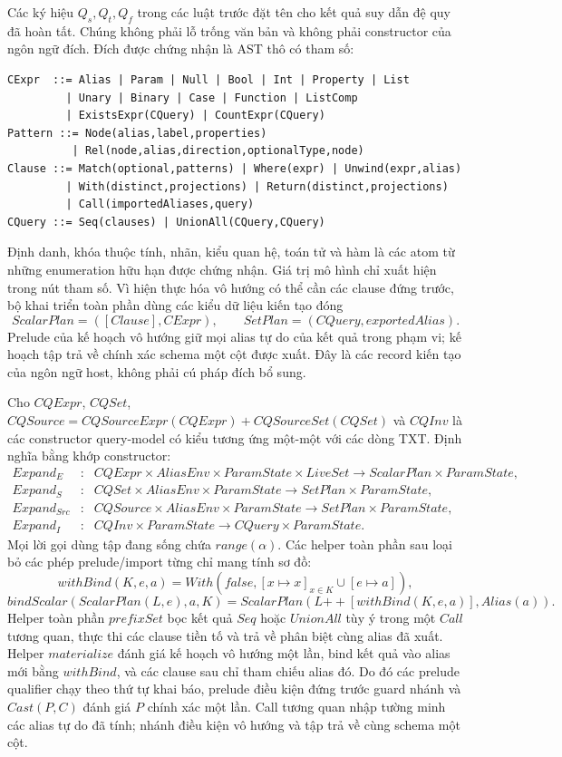 \documentclass[11pt,a4paper]{article}
\theoremstyle{definition}
\begin{document}
Các ký hiệu $Q_s,Q_t,Q_f$ trong các luật trước đặt tên cho kết quả suy dẫn đệ
quy đã hoàn tất. Chúng không phải lỗ trống văn bản và không phải constructor
của ngôn ngữ đích. Đích được chứng nhận là AST thô có tham số:
\begin{verbatim}
CExpr  ::= Alias | Param | Null | Bool | Int | Property | List
         | Unary | Binary | Case | Function | ListComp
         | ExistsExpr(CQuery) | CountExpr(CQuery)
Pattern ::= Node(alias,label,properties)
          | Rel(node,alias,direction,optionalType,node)
Clause ::= Match(optional,patterns) | Where(expr) | Unwind(expr,alias)
         | With(distinct,projections) | Return(distinct,projections)
         | Call(importedAliases,query)
CQuery ::= Seq(clauses) | UnionAll(CQuery,CQuery)
\end{verbatim}
Định danh, khóa thuộc tính, nhãn, kiểu quan hệ, toán tử và hàm là các atom từ
những enumeration hữu hạn được chứng nhận. Giá trị mô hình chỉ xuất hiện trong
nút tham số. Vì hiện thực hóa vô hướng có thể cần các clause đứng trước, bộ
khai triển toàn phần dùng các kiểu dữ liệu kiến tạo đóng
\[
 ScalarPlan=([Clause],CExpr),\qquad SetPlan=(CQuery,exportedAlias).
\]
Prelude của kế hoạch vô hướng giữ mọi alias tự do của kết quả trong phạm vi;
kế hoạch tập trả về chính xác schema một cột được xuất. Đây là các record kiến
tạo của ngôn ngữ host, không phải cú pháp đích bổ sung.

Cho $CQExpr$, $CQSet$, $CQSource=CQSourceExpr(CQExpr)+CQSourceSet(CQSet)$ và
$CQInv$ là các constructor query-model có kiểu tương ứng một-một với các dòng
TXT. Định nghĩa bằng khớp constructor:
\[
\begin{array}{rcl}
Expand_E&:&CQExpr\times AliasEnv\times ParamState\times LiveSet
          \longrightarrow ScalarPlan\times ParamState,\\
Expand_S&:&CQSet\times AliasEnv\times ParamState
          \longrightarrow SetPlan\times ParamState,\\
Expand_{Src}&:&CQSource\times AliasEnv\times ParamState
          \longrightarrow SetPlan\times ParamState,\\
Expand_I&:&CQInv\times ParamState
          \longrightarrow CQuery\times ParamState.
\end{array}
\]
Mọi lời gọi dùng tập đang sống chứa $range(\alpha)$. Các helper toàn phần sau
loại bỏ các phép prelude/import từng chỉ mang tính sơ đồ:
\[
withBind(K,e,a)=With(false,[x\mapsto x]_{x\in K}\cup[e\mapsto a]),
\]
\[
bindScalar(ScalarPlan(L,e),a,K)
=ScalarPlan(L\mathbin{+\!+}[withBind(K,e,a)],Alias(a)).
\]
Helper toàn phần $prefixSet$ bọc kết quả $Seq$ hoặc $UnionAll$ tùy ý trong một
$Call$ tương quan, thực thi các clause tiền tố và trả về phân biệt cùng alias đã
xuất. Helper $materialize$ đánh giá kế hoạch vô hướng một lần, bind kết quả vào
alias mới bằng $withBind$, và các clause sau chỉ tham chiếu alias đó. Do đó các
prelude qualifier chạy theo thứ tự khai báo, prelude điều kiện đứng trước guard
nhánh và $Cast(P,C)$ đánh giá $P$ chính xác một lần. Call tương quan nhập tường
minh các alias tự do đã tính; nhánh điều kiện vô hướng và tập trả về cùng schema
một cột.
\end{document}
